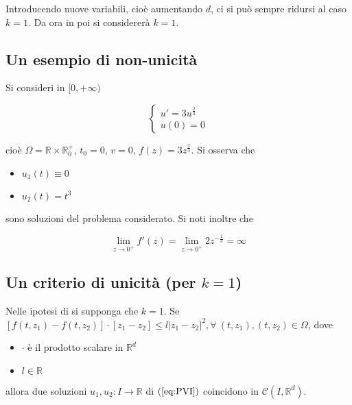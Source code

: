 \documentclass[hidelinks, 10pt]{report}
\begin{document}
Introducendo nuove variabili, cio\`e aumentando $ d $, ci si pu\`o sempre  ridursi al caso $ k = 1 $. Da ora in poi si considerer\`a $ k = 1 $.

\subsection{Un esempio di non-unicit\`a}
Si consideri in $ [0, +\infty) $

\[ \begin{cases}
u' = 3 u^{\frac{2}{3}} \\
u(0) = 0
\end{cases}
\]

cio\`e $ \Omega = \mathbb{R} \times \mathbb{R}^{+}_{0} $, $ t_{0} = 0 $, $ v = 0 $, $ f(z) = 3 z^{\frac{2}{3}} $. Si osserva che
\begin{itemize}
\item $ u_{1}(t) \equiv 0 $
\item $ u_{2}(t) = t^{3} $
\end{itemize}
sono soluzioni del problema considerato. Si noti inoltre che

\[ \lim\limits_{z \to 0^{+}} f'(z) = \lim\limits_{z \to 0^{+}} 2 z^{-\frac{1}{3}} = \infty \]

\subsection{Un criterio di unicit\`a (per $ k = 1 $)}
Nelle ipotesi di  si supponga che $ k = 1 $. Se $ [f(t, z_{1}) - f(t, z_{2})] \cdot [z_{1} - z_{2}] \le l \vert z_{1} - z_{2} \vert^{2}, \forall\ (t, z_{1}), (t, z_{2}) \in \Omega $, dove
\begin{itemize}
\item $ \cdot $ \`e il prodotto scalare in $ \mathbb{R}^{d} $
\item $ l \in \mathbb{R} $
\end{itemize}

allora due soluzioni $ u_{1}, u_{2}: I \to \mathbb{R} $ di $ (\ref{eq:PVI}) $ coincidono in $ \mathcal{C}(I, \mathbb{R}^{d}) $.
\end{document}
